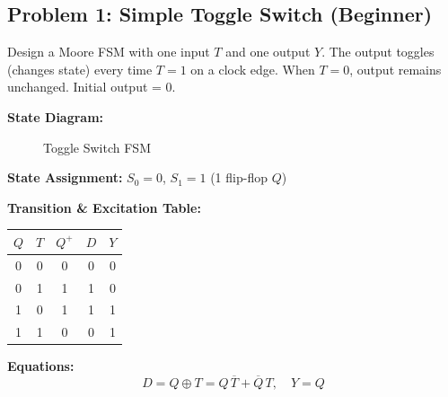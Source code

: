 \documentclass[12pt,a4paper]{article}
\begin{document}
\subsection{Problem 1: Simple Toggle Switch (Beginner)}

\begin{infobox}
Design a Moore FSM with one input $T$ and one output $Y$. The output toggles (changes state) every time $T=1$ on a clock edge. When $T=0$, output remains unchanged. Initial output = 0.
\end{infobox}

\textbf{State Diagram:}

\begin{figure}[H]
\centering
{}
\caption{Toggle Switch FSM}
\end{figure}

\textbf{State Assignment:} $S_0 = 0$, $S_1 = 1$ (1 flip-flop $Q$)

\textbf{Transition \& Excitation Table:}

\begin{table}[H]
\centering
\begin{tabular}{cc|c|c|c}
\toprule
$Q$ & $T$ & $Q^+$ & $D$ & $Y$ \\
\midrule
0 & 0 & 0 & 0 & 0 \\
0 & 1 & 1 & 1 & 0 \\
1 & 0 & 1 & 1 & 1 \\
1 & 1 & 0 & 0 & 1 \\
\bottomrule
\end{tabular}
\end{table}

\textbf{Equations:}
\[
D = Q \oplus T = Q\,\overline{T} + \overline{Q}\,T, \quad Y = Q
\]


\end{document}
